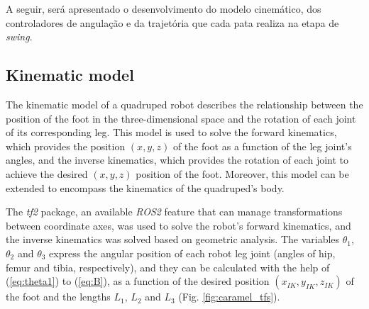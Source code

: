 \documentclass[conference]{IEEEtran}
\begin{document}
A seguir, será apresentado o desenvolvimento do modelo cinemático, dos controladores de angulação e da trajetória que cada pata realiza na etapa de \textit{swing}.

\subsection{Kinematic model}
\label{sec:detail_inv_kinematics}

The kinematic model of a quadruped robot describes the relationship between the position of the foot in the three-dimensional space and the rotation of each joint of its corresponding leg. This model is used to solve the forward kinematics, which provides the position $(x, y, z)$ of the foot as a function of the leg joint's angles, and the inverse kinematics, which provides the rotation of each joint to achieve the desired $(x, y, z)$ position of the foot. Moreover, this model can be extended to encompass the kinematics of the quadruped's body.

The \textit{tf2} package, an available \textit{ROS2} feature that can manage transformations between coordinate axes, was used to solve the robot's forward kinematics, and the inverse kinematics was solved based on geometric analysis. The variables $\theta_1$, $\theta_2$ and $\theta_3$ express the angular position of each robot leg joint (angles of hip, femur and tibia, respectively), and they can be calculated with the help of (\ref{eq:theta1}) to (\ref{eq:B}), as a function of the desired position $(x_{IK}, y_{IK}, z_{IK})$ of the foot and the lengths $L_1$, $L_2$ and $L_3$ (Fig. \ref{fig:caramel_tfs}).
\end{document}
